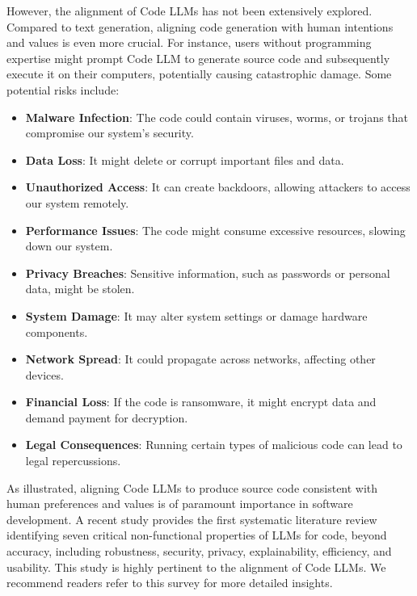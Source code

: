 However, the alignment of Code LLMs has not been extensively explored. 
Compared to text generation, aligning code generation with human intentions and values is even more crucial. For instance, users without programming expertise might prompt Code LLM to generate source code and subsequently execute it on their computers, potentially causing catastrophic damage. Some potential risks include:
\begin{itemize}
    \item \textbf{Malware Infection}: The code could contain viruses, worms, or trojans that compromise our system's security.
    \item \textbf{Data Loss}: It might delete or corrupt important files and data.
    \item \textbf{Unauthorized Access}: It can create backdoors, allowing attackers to access our system remotely.
    \item \textbf{Performance Issues}: The code might consume excessive resources, slowing down our system.
    \item \textbf{Privacy Breaches}: Sensitive information, such as passwords or personal data, might be stolen.
    \item \textbf{System Damage}: It may alter system settings or damage hardware components.
    \item \textbf{Network Spread}: It could propagate across networks, affecting other devices.
    \item \textbf{Financial Loss}: If the code is ransomware, it might encrypt data and demand payment for decryption.
    \item \textbf{Legal Consequences}: Running certain types of malicious code can lead to legal repercussions.
\end{itemize} 
As illustrated, aligning Code LLMs to produce source code consistent with human preferences and values is of paramount importance in software development. A recent study \cite{yang2024robustness} provides the first systematic literature review identifying seven critical non-functional properties of LLMs for code, beyond accuracy, including robustness, security, privacy, explainability, efficiency, and usability. This study is highly pertinent to the alignment of Code LLMs. We recommend readers refer to this survey for more detailed insights.





